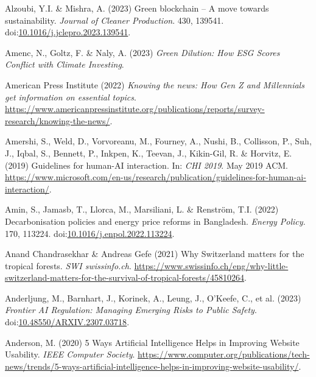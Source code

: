 \documentclass[
  letterpaper,
  DIV=11,
  numbers=noendperiod]{scrartcl}
\newlength{\cslhangindent}
\newenvironment{CSLReferences}[2] %
 {\begin{list}{}{%
  \setlength{\itemindent}{0pt}
  \setlength{\leftmargin}{0pt}
  \setlength{\parsep}{0pt}
  \ifodd #1
   \setlength{\leftmargin}{\cslhangindent}
   \setlength{\itemindent}{-1\cslhangindent}
  \fi
  \setlength{\itemsep}{#2\baselineskip}}}
 {\end{list}}
\begin{document}
\begin{CSLReferences}{0}{1}
Alzoubi, Y.I. \& Mishra, A. (2023) Green blockchain -- {A} move towards
sustainability. \emph{Journal of Cleaner Production}. 430, 139541.
doi:\href{https://doi.org/10.1016/j.jclepro.2023.139541}{10.1016/j.jclepro.2023.139541}.

Amenc, N., Goltz, F. \& Naly, A. (2023) \emph{Green {Dilution}: {How ESG
Scores Conflict} with {Climate Investing}}.

American Press Institute (2022) \emph{Knowing the news: {How Gen Z} and
{Millennials} get information on essential topics}.
\url{https://www.americanpressinstitute.org/publications/reports/survey-research/knowing-the-news/}.

Amershi, S., Weld, D., Vorvoreanu, M., Fourney, A., Nushi, B.,
Collisson, P., Suh, J., Iqbal, S., Bennett, P., Inkpen, K., Teevan, J.,
Kikin-Gil, R. \& Horvitz, E. (2019) Guidelines for human-{AI}
interaction. In: \emph{{CHI} 2019}. May 2019 ACM.
\url{https://www.microsoft.com/en-us/research/publication/guidelines-for-human-ai-interaction/}.

Amin, S., Jamasb, T., Llorca, M., Marsiliani, L. \& Renström, T.I.
(2022) Decarbonisation policies and energy price reforms in
{Bangladesh}. \emph{Energy Policy}. 170, 113224.
doi:\href{https://doi.org/10.1016/j.enpol.2022.113224}{10.1016/j.enpol.2022.113224}.

Anand Chandrasekhar \& Andreas Gefe (2021) Why {Switzerland} matters for
the tropical forests. \emph{SWI swissinfo.ch}.
\url{https://www.swissinfo.ch/eng/why-little-switzerland-matters-for-the-survival-of-tropical-forests/45810264}.

Anderljung, M., Barnhart, J., Korinek, A., Leung, J., O'Keefe, C., et
al. (2023) \emph{Frontier {AI Regulation}: {Managing Emerging Risks} to
{Public Safety}}.
doi:\href{https://doi.org/10.48550/ARXIV.2307.03718}{10.48550/ARXIV.2307.03718}.

Anderson, M. (2020) 5 {Ways Artificial Intelligence Helps} in {Improving
Website Usability}. \emph{IEEE Computer Society}.
\url{https://www.computer.org/publications/tech-news/trends/5-ways-artificial-intelligence-helps-in-improving-website-usability/}.


\end{CSLReferences}
\end{document}
